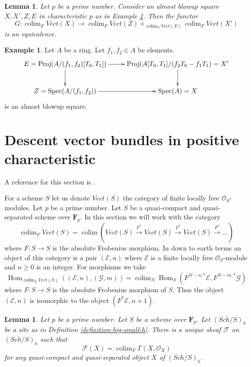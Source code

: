 \documentclass[10pt,a4paper]{amsart}
\theoremstyle{plain}
\newtheorem{lemma}[subsection]{Lemma}
\theoremstyle{definition}
\newtheorem{example}[subsection]{Example}
\theoremstyle{remark}
\numberwithin{equation}{subsection}
\def\colim{\mathop{\mathrm{colim}}\nolimits}
\def\Spec{\mathop{\mathrm{Spec}}}
\def\Hom{\mathop{\mathrm{Hom}}\nolimits}
\def\Sch{\mathit{Sch}}
\begin{document}
\begin{lemma}
\label{lemma-vector-bundle-II}
Let $p$ be a prime number. Consider an almost blowup square $X, X', Z, E$
in characteristic $p$ as in Example \ref{example-two-generators}.
Then the functor
$$
G :
\colim_F \textit{Vect}(X)
\longrightarrow
\colim_F \textit{Vect}(Z)
\times_{\colim_F \textit{Vect}(E)}
\colim_F \textit{Vect}(X')
$$
is an equivalence.
\end{lemma}

\begin{example}
\label{example-two-generators}
Let $A$ be a ring. Let $f_1, f_2 \in A$ be elements.
$$
\xymatrix{
E = \text{Proj}(A/(f_1, f_2)[T_0, T_1]) \ar[r] \ar[d] &
\text{Proj}(A[T_0, T_1]/(f_2 T_0 - f_1 T_1) = X' \ar[d] \\
Z = \Spec(A/(f_1, f_2)) \ar[r] & \Spec(A) = X
}
$$
is an almost blowup square.
\end{example}

\section{Descent vector bundles in positive characteristic}
\label{section-descent-vectorbundles-h}

\noindent
A reference for this section is \cite{Witt-Grass}.

\medskip\noindent
For a scheme $S$ let us denote $\textit{Vect}(S)$ the category
of finite locally free $\mathcal{O}_S$-modules.
Let $p$ be a prime number. Let $S$ be a quasi-compact and quasi-separated
scheme over $\mathbf{F}_p$. In this section we will work with the
category
$$
\colim_F \textit{Vect}(S) =
\colim
\left(
\textit{Vect}(S) \xrightarrow{F^*}
\textit{Vect}(S) \xrightarrow{F^*}
\textit{Vect}(S) \xrightarrow{F^*} \ldots
\right)
$$
where $F : S \to S$ is the absolute Frobenius morphism. In down
to earth terms an object of this category is a pair $(\mathcal{E}, n)$
where $\mathcal{E}$ is a finite locally free $\mathcal{O}_S$-module
and $n \geq 0$ is an integer. For morphisms we take
$$
\Hom_{\colim_F \textit{Vect}(S)}((\mathcal{E}, n), (\mathcal{G}, m)) =
\colim_N \Hom_S(F^{N - n, *}\mathcal{E}, F^{N - m, *}\mathcal{G})
$$
where $F : S \to S$ is the absolute Frobenius morphism of $S$.
Thus the object $(\mathcal{E}, n)$ is isomorphic to the object
$(F^*\mathcal{E}, n + 1)$.

\begin{lemma}
\label{lemma-h-sheaf-colim-F}
Let $p$ be a prime number. Let $S$ be a scheme over $\mathbf{F}_p$.
Let $(\Sch/S)_h$ be a site as in Definition \ref{definition-big-small-h}.
There is a unique sheaf $\mathcal{F}$ on $(\Sch/S)_h$ such that
$$
\mathcal{F}(X) = \colim_F \Gamma(X, \mathcal{O}_X)
$$
for any quasi-compact and quasi-separated object $X$ of $(\Sch/S)_h$.
\end{lemma}
\end{document}
